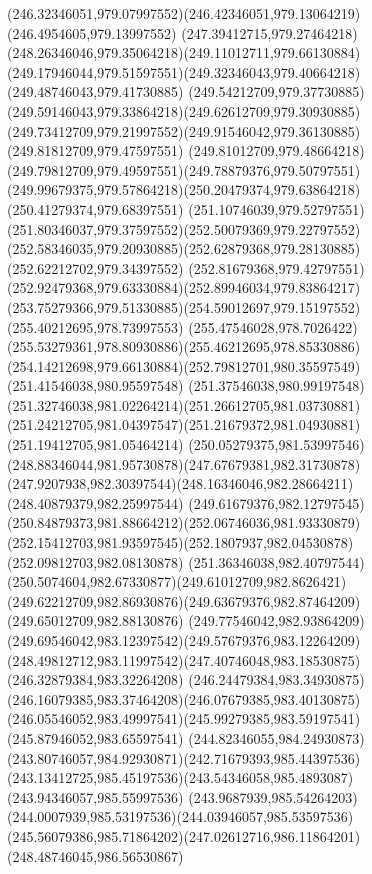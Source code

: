 {{		\curveto(246.32346051,979.07997552)(246.42346051,979.13064219)(246.4954605,979.13997552)
		\curveto(247.39412715,979.27464218)(248.26346046,979.35064218)(249.11012711,979.66130884)
		\curveto(249.17946044,979.51597551)(249.32346043,979.40664218)(249.48746043,979.41730885)
		\curveto(249.54212709,979.37730885)(249.59146043,979.33864218)(249.62612709,979.30930885)
		\curveto(249.73412709,979.21997552)(249.91546042,979.36130885)(249.81812709,979.47597551)
		\curveto(249.81012709,979.48664218)(249.79812709,979.49597551)(249.78879376,979.50797551)
		\curveto(249.99679375,979.57864218)(250.20479374,979.63864218)(250.41279374,979.68397551)
		\curveto(251.10746039,979.52797551)(251.80346037,979.37597552)(252.50079369,979.22797552)
		\curveto(252.58346035,979.20930885)(252.62879368,979.28130885)(252.62212702,979.34397552)
		\curveto(252.81679368,979.42797551)(252.92479368,979.63330884)(252.89946034,979.83864217)
		\curveto(253.75279366,979.51330885)(254.59012697,979.15197552)(255.40212695,978.73997553)
		\curveto(255.47546028,978.7026422)(255.53279361,978.80930886)(255.46212695,978.85330886)
		\curveto(254.14212698,979.66130884)(252.79812701,980.35597549)(251.41546038,980.95597548)
		\curveto(251.37546038,980.99197548)(251.32746038,981.02264214)(251.26612705,981.03730881)
		\curveto(251.24212705,981.04397547)(251.21679372,981.04930881)(251.19412705,981.05464214)
		\curveto(250.05279375,981.53997546)(248.88346044,981.95730878)(247.67679381,982.31730878)
		\curveto(247.9207938,982.30397544)(248.16346046,982.28664211)(248.40879379,982.25997544)
		\curveto(249.61679376,982.12797545)(250.84879373,981.88664212)(252.06746036,981.93330879)
		\curveto(252.15412703,981.93597545)(252.1807937,982.04530878)(252.09812703,982.08130878)
		\curveto(251.36346038,982.40797544)(250.5074604,982.67330877)(249.61012709,982.8626421)
		\curveto(249.62212709,982.86930876)(249.63679376,982.87464209)(249.65012709,982.88130876)
		\curveto(249.77546042,982.93864209)(249.69546042,983.12397542)(249.57679376,983.12264209)
		\curveto(248.49812712,983.11997542)(247.40746048,983.18530875)(246.32879384,983.32264208)
		\curveto(246.24479384,983.34930875)(246.16079385,983.37464208)(246.07679385,983.40130875)
		\curveto(246.05546052,983.49997541)(245.99279385,983.59197541)(245.87946052,983.65597541)
		\curveto(244.82346055,984.24930873)(243.80746057,984.92930871)(242.71679393,985.44397536)
		\curveto(243.13412725,985.45197536)(243.54346058,985.4893087)(243.94346057,985.55997536)
		\curveto(243.9687939,985.54264203)(244.0007939,985.53197536)(244.03946057,985.53597536)
		\curveto(245.56079386,985.71864202)(247.02612716,986.11864201)(248.48746045,986.56530867)
}}
